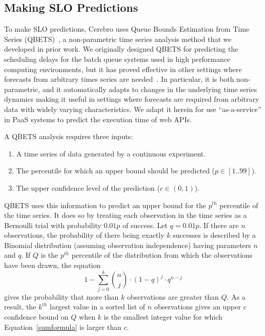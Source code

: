 \subsection{Making SLO Predictions}
\label{sec:qbets}
To make SLO predictions, Cerebro uses 
Queue Bounds Estimation from Time Series (QBETS)~\cite{Nurmi:2007:QQB:1791551.1791556},
a non-parametric time series analysis method that we developed in prior work.
We originally designed QBETS for
predicting the scheduling delays for the batch queue systems 
used in high performance computing environments, but it has proved effective
in other settings where forecasts from arbitrary times series are
needed~\cite{uptime-bootstrap,quant-est,euca-power-tr-14}.  In 
particular, it is both
non-parametric, and it automatically
adapts to changes in the underlying time series dynamics making it useful in
settings where forecasts are required from arbitrary data with widely varying
characteristics. 
We adapt it herein for use ``as-a-service'' in PaaS systems 
to predict the execution time of web APIs.

A QBETS analysis requires three inputs:
\begin{enumerate}
\item A time series of data generated by a continuous experiment.
\item The percentile for which an upper bound should be predicted ($p \in [1..99]$).
\item The upper confidence level of the prediction ($c \in (0,1)$).
\end{enumerate}

QBETS uses this information to predict an upper bound for 
the $p^{th}$ percentile of the time series.  It does so by treating each
observation in the time series as a Bernoulli trial with probability $0.01p$ of success.  Let $q
= 0.01p$.  If there are $n$ observations, the probability of there being
exactly $k$ successes is described by a Binomial distribution (assuming
observation independence)
having parameters $n$ and $q$.  If $Q$ is the $p^{th}$ percentile of the
distribution from which the observations have been drawn, the equation 
\begin{equation}\label{sumformula}
1 - \sum_{j=0}^k { n \choose j } \cdot (1-q)^{j} \cdot q^{n-j}
\end{equation}
gives the probability that more than $k$ observations are greater than $Q$.
As a result, the $k^{th}$ largest value in a sorted list of $n$ observations
gives an upper $c$ confidence bound on $Q$ when $k$ is the smallest integer
value for which Equation~\ref{sumformula} is larger than $c$.

